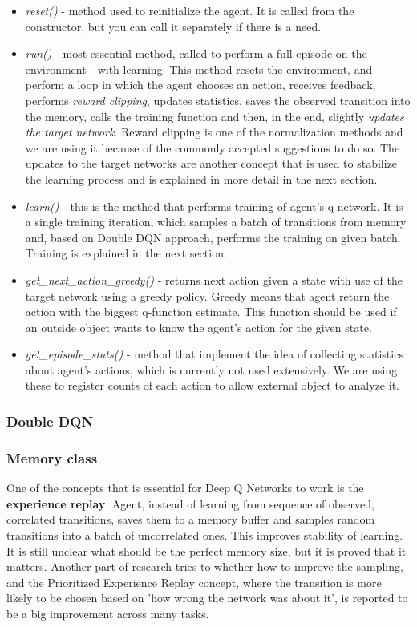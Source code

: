 \documentclass{article}
\begin{document}
\begin{itemize}
\item \textit{reset()} - method used to reinitialize the agent. It is called from the constructor, but you can call it separately if there is a need.
\item \textit{run()} - most essential method, called to perform a full episode on the environment - with learning. This method resets the environment, and perform a loop in which the agent chooses an action, receives feedback, performs \textit{reward clipping}, updates statistics, saves the observed transition into the memory, calls the training function and then, in the end, slightly \textit{updates the target network}. Reward clipping is one of the normalization methods and we are using it because of the commonly accepted suggestions to do so. The updates to the target networks are another concept that is used to stabilize the learning process and is explained in more detail in the next section.
\item \textit{learn()} - this is the method that performs training of agent's q-network. It is a single training iteration, which samples a batch of transitions from memory and, based on Double DQN approach, performs the training on given batch. Training is explained in the next section. 
\item \textit{get\_next\_action\_greedy()} - returns next action given a state with use of the target network using a greedy policy. Greedy means that agent return the action with the biggest q-function estimate. This function should be used if an outside object wants to know the agent's action for the given state.
\item \textit{get\_episode\_stats()} - method that implement the idea of collecting statistics about agent's actions, which is currently not used extensively. We are using these to register counts of each action to allow external object to analyze it.
\end{itemize}

\subsubsection{Double DQN}


\subsubsection{Memory class}
One of the concepts that is essential for Deep Q Networks to work is the \textbf{experience replay}. Agent, instead of learning from sequence of observed, correlated transitions, saves them to a memory buffer and samples random transitions into a batch of uncorrelated ones. This improves stability of learning. It is still unclear what should be the perfect memory size, but it is proved that it matters. Another part of research tries to whether how to improve the sampling, and the Prioritized Experience Replay concept, where the transition is more likely to be chosen based on 'how wrong the network was about it', is reported to be a big improvement across many tasks.
\end{document}
